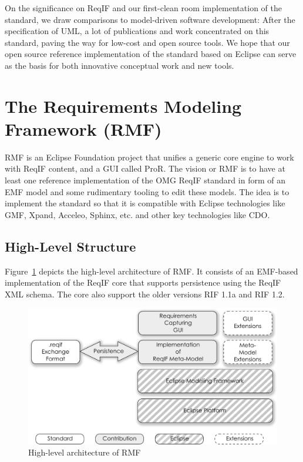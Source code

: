 \documentclass{template/openetcs_report}
\begin{document}
On the significance on ReqIF and our first-clean room implementation of the standard, we draw comparisons to model-driven software development: After the specification of UML, a lot of publications and work concentrated on this standard, paving the way for low-cost and open source tools. We hope that our open source reference implementation of the standard based on Eclipse can serve as the basis for both innovative conceptual work and new tools.

\section{The Requirements Modeling Framework (RMF)}

RMF is an Eclipse Foundation project that unifies a generic core engine to work with ReqIF content, and a GUI called ProR.  The vision or RMF is to have at least one reference implementation of the OMG ReqIF standard in form of an EMF model and some rudimentary tooling to edit these models. The idea is to implement the standard so that it is compatible with Eclipse technologies like GMF, Xpand, Acceleo, Sphinx, etc. and other key technologies like CDO.

\subsection{High-Level Structure}

Figure~\ref{fig:architecture} depicts the high-level architecture of RMF. It consists of an EMF-based implementation of the ReqIF core that supports persistence using the ReqIF XML schema.  The core also support the older versions RIF 1.1a and RIF 1.2.

\begin{figure}[h!t]
	\begin{center}
	\includegraphics[width=\textwidth]{img/architecture.pdf}
	\end{center}
	\caption{High-level architecture of RMF}
	\label{fig:architecture}
\end{figure}
\end{document}
